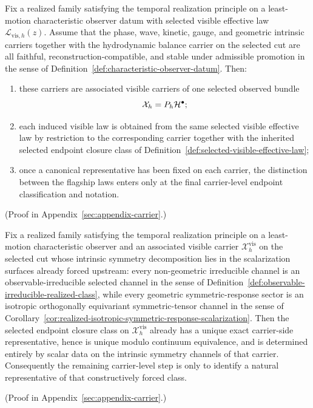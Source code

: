 \begin{theorem}
\label{thm:common-selected-bundle-assembly}
Fix a realized family satisfying the temporal realization principle on a
least-motion characteristic observer datum with selected visible effective law
\(\mathcal L_{\mathrm{vis},h}(z)\). Assume that the phase, wave, kinetic,
gauge, and geometric intrinsic carriers together with the hydrodynamic balance
carrier on the selected cut are all faithful,
reconstruction-compatible, and stable under admissible promotion in the sense
of Definition~\ref{def:characteristic-observer-datum}.
Then:
\begin{enumerate}[label=(\roman*), leftmargin=2em, itemsep=0.2em]
\item these carriers are associated visible carriers of one selected observed
      bundle
      \[
      \mathcal X_h=P_h\mathcal{H}^\bullet;
      \]
\item each induced visible law is obtained from the same selected
      visible effective law by restriction to the corresponding carrier
      together with the inherited selected endpoint closure class of
      Definition~\ref{def:selected-visible-effective-law};
\item once a canonical representative has been fixed on each carrier, the
      distinction between the flagship laws enters only at the final
      carrier-level endpoint classification and notation.
\end{enumerate}
\end{theorem}

(Proof in Appendix~\ref{sec:appendix-carrier}.)

\begin{theorem}
\label{thm:common-endpoint-rigidity-reduction}
Fix a realized family satisfying the temporal realization principle on a
least-motion characteristic observer and an associated visible carrier
\(\mathcal X_h^{\mathrm{vis}}\) on the selected cut whose intrinsic symmetry
decomposition lies in the scalarization surfaces already forced upstream:
every non-geometric irreducible channel is an observable-irreducible selected
channel in the sense of
Definition~\ref{def:observable-irreducible-realized-class}, while every
geometric symmetric-response sector is an isotropic orthogonally equivariant
symmetric-tensor channel in the sense of
Corollary~\ref{cor:realized-isotropic-symmetric-response-scalarization}.
Then the selected endpoint closure class on
\(\mathcal X_h^{\mathrm{vis}}\) already has a unique exact carrier-side
representative, hence is unique modulo continuum equivalence, and is determined
entirely by scalar data on the intrinsic symmetry channels of that carrier.
Consequently the remaining carrier-level step is only to identify a natural
representative of that constructively forced class.
\end{theorem}

(Proof in Appendix~\ref{sec:appendix-carrier}.)
